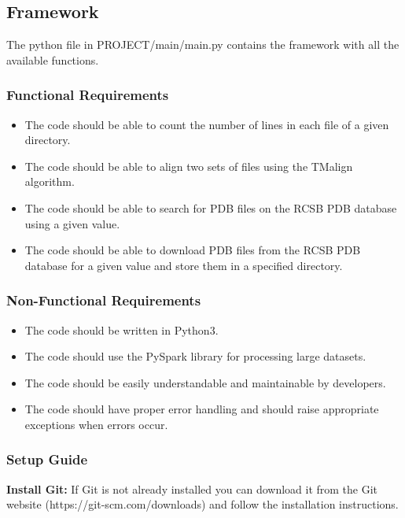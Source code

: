 \documentclass[]{final_report}
\begin{document}
\subsection{Framework}
The python file in PROJECT/main/main.py contains the framework with all the available functions.

\subsubsection{Functional Requirements}

\begin{itemize}
    \item The code should be able to count the number of lines in each file of a given directory.
    \item The code should be able to align two sets of files using the TMalign algorithm.
    \item The code should be able to search for PDB files on the RCSB PDB database using a given value.
    \item The code should be able to download PDB files from the RCSB PDB database for a given value and store them in a specified directory.
\end{itemize}

\subsubsection{Non-Functional Requirements}

\begin{itemize}
    \item The code should be written in Python3.
    \item The code should use the PySpark library for processing large datasets.
    \item The code should be easily understandable and maintainable by developers.
    \item The code should have proper error handling and should raise appropriate exceptions when errors occur.
\end{itemize}

\clearpage

\subsubsection{Setup Guide}

\textbf{Install Git:} If Git is not already installed you can download it from the Git website (https://git-scm.com/downloads) and follow the installation instructions.
\end{document}
